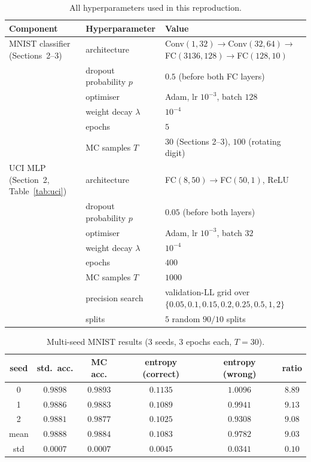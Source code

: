 \documentclass{article}
\begin{document}
\begin{table}[h]
\centering
\caption{All hyperparameters used in this reproduction.}
\small
\begin{tabular}{llp{}}
\toprule
Component & Hyperparameter & Value \\
\midrule
MNIST classifier (Sections~2--3)
   & architecture       & Conv$(1,32)\!\to\!$Conv$(32,64)\!\to\!$FC$(3136,128)\!\to\!$FC$(128,10)$ \\
   & dropout probability $p$ & $0.5$ (before both FC layers) \\
   & optimiser          & Adam, lr $10^{-3}$, batch $128$ \\
   & weight decay $\lambda$  & $10^{-4}$ \\
   & epochs             & $5$ \\
   & MC samples $T$     & $30$ (Sections 2--3), $100$ (rotating digit) \\
\midrule
UCI MLP (Section~2, Table~\ref{tab:uci})
   & architecture       & FC$(8,50)\!\to\!$FC$(50,1)$, ReLU \\
   & dropout probability $p$ & $0.05$ (before both layers) \\
   & optimiser          & Adam, lr $10^{-3}$, batch $32$ \\
   & weight decay $\lambda$  & $10^{-4}$ \\
   & epochs             & $400$ \\
   & MC samples $T$     & $1000$ \\
   & precision search   & validation-LL grid over $\{0.05,0.1,0.15,0.2,0.25,0.5,1,2\}$ \\
   & splits             & $5$ random $90/10$ splits \\
\bottomrule
\end{tabular}
\end{table}

\begin{table}[h]
\centering
\caption{Multi-seed MNIST results (3 seeds, 3 epochs each, $T\!=\!30$).}
\small
\begin{tabular}{cccccc}
\toprule
seed & std.\ acc. & MC acc. & entropy (correct) & entropy (wrong) & ratio \\
\midrule
0    & $0.9898$ & $0.9893$ & $0.1135$ & $1.0096$ & $8.89$ \\
1    & $0.9886$ & $0.9883$ & $0.1089$ & $0.9941$ & $9.13$ \\
2    & $0.9881$ & $0.9877$ & $0.1025$ & $0.9308$ & $9.08$ \\
\midrule
mean & $0.9888$ & $0.9884$ & $0.1083$ & $0.9782$ & $9.03$ \\
std  & $0.0007$ & $0.0007$ & $0.0045$ & $0.0341$ & $0.10$ \\
\bottomrule
\end{tabular}
\end{table}
\end{document}
